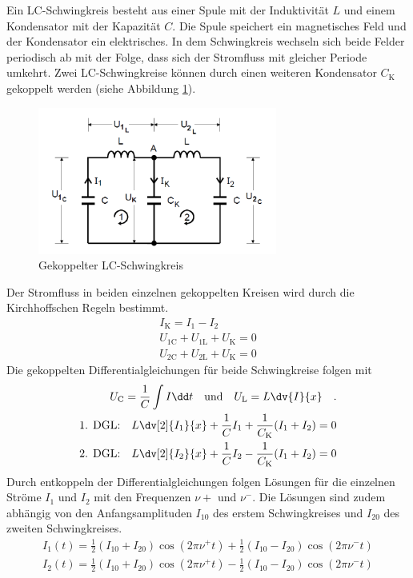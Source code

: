 Ein LC-Schwingkreis besteht aus einer Spule mit der Induktivität $L$ und einem Kondensator mit der Kapazität $C$. Die Spule speichert ein magnetisches Feld und der Kondensator ein elektrisches. In dem Schwingkreis wechseln sich beide Felder periodisch ab mit der Folge, dass sich der Stromfluss  mit gleicher Periode umkehrt. Zwei LC-Schwingkreise können durch einen weiteren Kondensator $C_\text{K}$ gekoppelt werden (siehe Abbildung \ref{fig:Abb2}). \\
\begin{figure}[h!]
	\centering
	\includegraphics[width=0.7\textwidth]{Abb2.png}
	\caption{Gekoppelter LC-Schwingkreis}
	\label{fig:Abb2}
\end{figure}
Der Stromfluss in beiden einzelnen gekoppelten Kreisen wird durch die Kirchhoffschen Regeln bestimmt.
\begin{align}
I_\text{K} = I_\text{1}-I_\text{2} \\
U_\text{1C} + U_\text{1L} + U_\text{K} = 0 \\
U_\text{2C} + U_\text{2L} + U_\text{K} = 0
\end{align}
Die gekoppelten Differentialgleichungen für beide Schwingkreise folgen mit
\begin{align}
U_\text{C} = \frac{1}{C} \int I \dd t \quad \text{und} \quad U_\text{L} = L \dv{I}{x} \quad .  \\
\text{1. DGL:} \quad L \dv[2]{I_1}{x} + \frac{1}{C} I_1 + \frac{1}{C_\text{K}}(I_1 + I_2) = 0 \\
\text{2. DGL:} \quad L \dv[2]{I_2}{x} + \frac{1}{C} I_2 - \frac{1}{C_\text{K}} (I_1 + I_2) = 0
\end{align}
Durch entkoppeln der Differentialgleichungen folgen Lösungen für die einzelnen Ströme $I_1$ und $I_2$ mit den Frequenzen $\nu+$ und $\nu^-$. Die Lösungen sind zudem abhängig von den Anfangsamplituden $I_{10}$ des erstem Schwingkreises und $I_{20}$ des zweiten Schwingkreises.
\begin{align}
I_1(t) = \frac{1}{2}(I_{10} + I_{20}) \cos(2 \pi \nu^+ t) + \frac{1}{2}(I_{10} - I_{20}) \cos(2 \pi \nu^- t) \\
I_2(t) = \frac{1}{2}(I_{10} + I_{20}) \cos(2 \pi \nu^+ t) - \frac{1}{2}(I_{10} - I_{20}) \cos(2 \pi \nu^- t)
\end{align}
